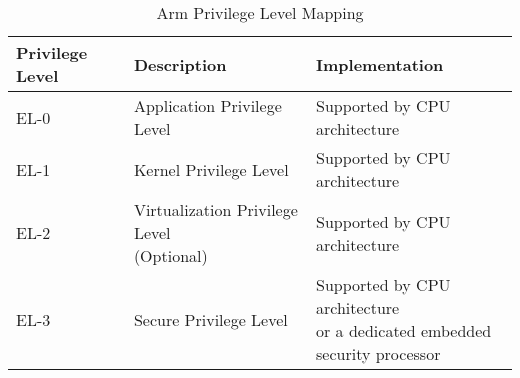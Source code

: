 \begin{table}[ht]
\centering
\begin{tabular}{|l|l|l|}
\hline
\textbf{Privilege Level} & \textbf{Description} & \textbf{Implementation}                                          \\ \hline
EL-0 & Application Privilege Level & Supported by CPU architecture                                                   \\ \hline
EL-1 & Kernel Privilege Level & Supported by CPU architecture                                                   \\ \hline
EL-2 & \makecell[l]{Virtualization Privilege Level \\ (Optional)} & Supported by CPU architecture                                                   \\ \hline
EL-3 & Secure Privilege Level & \makecell[l]{Supported by CPU architecture \\ or a dedicated embedded \\ security processor} \\ \hline
\end{tabular}
\caption{Arm Privilege Level Mapping}
\label{tab:arm_priv_lev_map}
\end{table}
